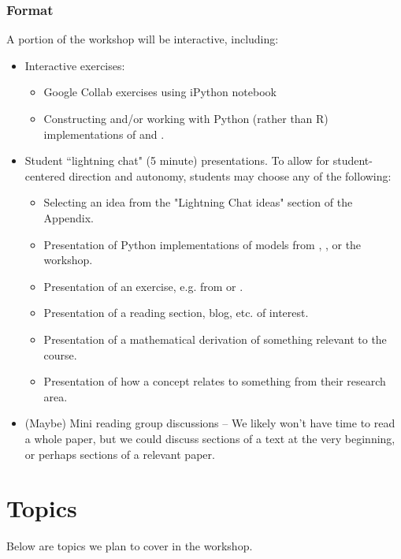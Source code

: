 \documentclass{article} %
\begin{document}
\subsubsection{Format}

A portion of the workshop will be interactive,  including:

\begin{itemize}
\item Interactive exercises:
	\begin{itemize}
	\item Google Collab exercises using iPython notebook
	\item Constructing and/or working with Python (rather than R) implementations of \cite{hoff2009first} and \cite{gelman2013bayesian}.
	\end{itemize}
\item Student ``lightning chat" (5 minute) presentations.  To allow for student-centered direction and autonomy,  students may choose any of the following:
	\begin{itemize}
	\item Selecting an idea from the "Lightning Chat ideas" section of the Appendix. 
	\item Presentation of Python implementations of models from \cite{hoff2009first} ,  \cite{ gelman2013bayesian},  or the workshop.
	\item Presentation of an exercise, e.g. from \cite{gelman2013bayesian} or \cite{hoff2009first}.
	\item Presentation of a reading section,  blog,  etc.  of interest.
	\item Presentation of a mathematical derivation of something relevant to the course.
	\item Presentation of how a concept relates to something from their research area.
	\end{itemize}
\item (Maybe) Mini reading group discussions  -- We likely won't have time to read a whole paper,  but we could discuss sections of a text at the very beginning, or perhaps sections of a relevant paper.
\end{itemize}


\section{Topics}

Below are topics we plan to cover in the workshop.
\end{document}
